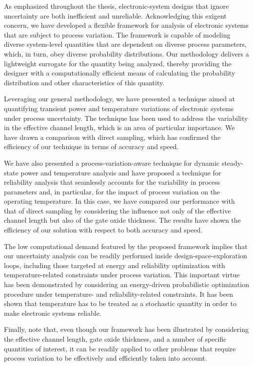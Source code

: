 As emphasized throughout the thesis, electronic-system designs that ignore
uncertainty are both inefficient and unreliable. Acknowledging this exigent
concern, we have developed a flexible framework for analysis of electronic
systems that are subject to process variation. The framework is capable of
modeling diverse system-level quantities that are dependent on diverse process
parameters, which, in turn, obey diverse probability distributions. Our
methodology delivers a lightweight surrogate for the quantity being analyzed,
thereby providing the designer with a computationally efficient means of
calculating the probability distribution and other characteristics of this
quantity.

Leveraging our general methodology, we have presented a technique aimed at
quantifying transient power and temperature variations of electronic systems
under process uncertainty. The technique has been used to address the
variability in the effective channel length, which is an area of particular
importance. We have drawn a comparison with direct sampling, which has confirmed
the efficiency of our technique in terms of accuracy and speed.

We have also presented a process-variation-aware technique for dynamic
steady-state power and temperature analysis and have proposed a technique for
reliability analysis that seamlessly accounts for the variability in process
parameters and, in particular, for the impact of process variation on the
operating temperature. In this case, we have compared our performance with that
of direct sampling by considering the influence not only of the effective
channel length but also of the gate oxide thickness. The results have shown the
efficiency of our solution with respect to both accuracy and speed.

The low computational demand featured by the proposed framework implies that our
uncertainty analysis can be readily performed inside design-space-exploration
loops, including those targeted at energy and reliability optimization with
temperature-related constraints under process variation. This important virtue
has been demonstrated by considering an energy-driven probabilistic optimization
procedure under temperature- and reliability-related constraints. It has been
shown that temperature has to be treated as a stochastic quantity in order to
make electronic systems reliable.

Finally, note that, even though our framework has been illustrated by
considering the effective channel length, gate oxide thickness, and a number of
specific quantities of interest, it can be readily applied to other problems
that require process variation to be effectively and efficiently taken into
account.
